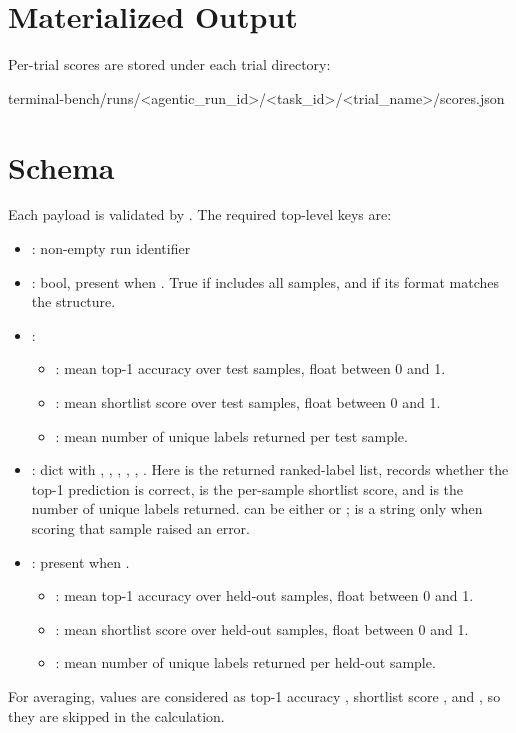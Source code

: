 \documentclass[11pt]{article}
\begin{document}
\section*{Materialized Output}
Per-trial scores are stored under each trial directory:
\begin{DocCode}
terminal-bench/runs/<agentic_run_id>/<task_id>/<trial_name>/scores.json
\end{DocCode}

\section*{ Schema}
Each  payload is validated by .
The required top-level keys are:
\begin{itemize}
  \item {}: non-empty run identifier
  \item {}: bool, present when . 
  True if  includes all samples, and if its format matches the  structure.
  \item {}: 
  \begin{itemize}
  \item {}: mean top-1 accuracy over test samples, float between 0 and 1.
  \item {}: mean shortlist score over test samples, float between 0 and 1.
  \item {}: mean number of unique labels returned per test sample.
  \end{itemize}
  \item {}: dict with , , , , , .
  Here  is the returned ranked-label list,  records whether the top-1 prediction is correct,  is the per-sample shortlist score, and  is the number of unique labels returned.
   can be either  or ;  is a string only when scoring that sample raised an error.
  \item {}: present when .
  \begin{itemize}
    \item {}: mean top-1 accuracy over held-out  samples, float between 0 and 1.
    \item {}: mean shortlist score over held-out  samples, float between 0 and 1.
    \item {}: mean number of unique labels returned per held-out sample.
  \end{itemize}
\end{itemize}
For averaging,  values are considered as top-1 accuracy , shortlist score , and , so they are skipped in the  calculation.
\end{document}
